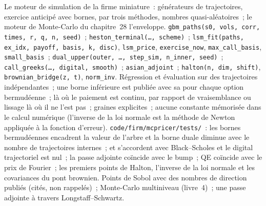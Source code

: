 \begin{build}
 Le moteur de simulation de la firme miniature~: générateurs de trajectoires, exercice anticipé avec bornes,  par trois méthodes, nombres quasi-aléatoires~;
le moteur de Monte-Carlo du chapitre~28 l'enveloppe.
 \texttt{gbm\_paths(s0, vols, corr, times, r, q, n, seed)}~; \texttt{heston\_terminal(\ldots, scheme)}~; \texttt{lsm\_fit(paths, ex\_idx, payoff,
basis, k, disc)}, \texttt{lsm\_price}, \texttt{exercise\_now}, \texttt{max\_call\_basis}, \texttt{small\_basis}~; \texttt{dual\_upper(outer, \ldots, step\_sim,
n\_inner, seed)}~; \texttt{call\_greeks(\ldots, digital, smooth)}~; \texttt{asian\_adjoint}~; \texttt{halton(n, dim, shift)}, \texttt{brownian\_bridge(z, t)},
\texttt{norm\_inv}.
 Régression et évaluation sur des trajectoires indépendantes~; une borne inférieure est publiée avec sa  pour chaque option bermudéenne~;  là où
le paiement est continu, par rapport de vraisemblance ou lissage là où il ne l'est pas~; graines explicites~; aucune constante mémorisée dans le calcul numérique (l'inverse de la loi normale est
la méthode de Newton appliquée à la fonction d'erreur).
 \texttt{code/firm/mcpricer/tests/}~: les bornes bermudéennes encadrent la valeur de l'arbre et la borne duale diminue avec le nombre de trajectoires internes~;  et
 s'accordent avec Black--Scholes et le digital trajectoriel est nul~; la passe adjointe coïncide avec le bump~; QE coïncide avec le prix de Fourier~; les premiers
points de Halton, l'inverse de la loi normale et les covariances du pont brownien.
 Points de Sobol avec des nombres de direction publiés (cités, non rappelés)~; Monte-Carlo multiniveau (livre~4)~; une passe adjointe à travers
Longstaff--Schwartz.
\end{build}

